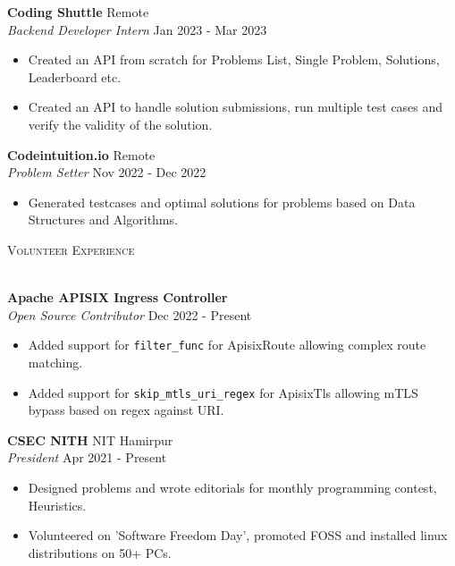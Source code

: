 \documentclass[a4paper]{article}
\newcommand{\lineunder} {
    \vspace*{-8pt} \\
    \hspace*{-18pt} \hrulefill \\
}
\newcommand{\header} [1] {
    {\hspace*{-18pt}\vspace*{6pt} \textsc{#1}}
    \vspace*{-6pt} \lineunder
}
\begin{document}
\textbf{Coding Shuttle} \hfill Remote\\
\textit{Backend Developer Intern} \hfill Jan 2023 - Mar 2023\\
\begin{itemize}
  \item Created an API from scratch for Problems List, Single Problem, Solutions, Leaderboard etc.
	\item Created an API to handle solution submissions, run multiple test cases and verify the validity of the solution.
\end{itemize}
\vspace{1.5mm}

\textbf{Codeintuition.io} \hfill Remote\\
\textit{Problem Setter} \hfill Nov 2022 - Dec 2022\\
\begin{itemize}
	\item Generated testcases and optimal solutions for problems based on Data Structures and Algorithms.
\end{itemize}
\vspace{1.5mm}


\header{Volunteer Experience}
\vspace{1mm}

\textbf{Apache APISIX Ingress Controller}\\
\textit{Open Source Contributor} \hfill Dec 2022 - Present\\
\begin{itemize}
	\item Added support for \texttt{filter\_func} for ApisixRoute allowing complex route matching.
    \item Added support for \texttt{skip\_mtls\_uri\_regex} for ApisixTls allowing mTLS bypass based on regex against URI.
\end{itemize}
\vspace{1.5mm}

\textbf{CSEC NITH} \hfill NIT Hamirpur\\
\textit{President} \hfill Apr 2021 - Present\\
\begin{itemize}
	\item Designed problems and wrote editorials for monthly programming contest, Heuristics.
	\item Volunteered on 'Software Freedom Day', promoted FOSS and installed linux distributions on 50+ PCs.
\end{itemize}
\vspace{1.5mm}
\end{document}
